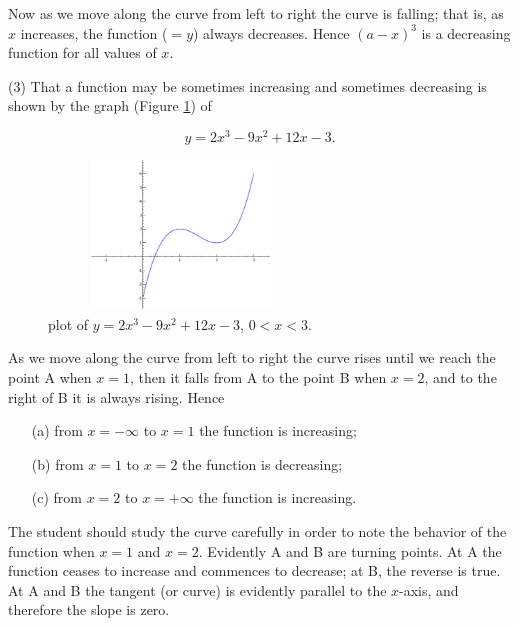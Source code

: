 \begin{example}
{\noindent
Now as we move along the curve from left to right the curve is 
falling; that is, as $x$ increases, the function ($= y$) always 
decreases. Hence $(a - x)^3$ is a decreasing function for all values of $x$.

(3) That a function may be sometimes increasing and sometimes 
decreasing is shown by the graph (Figure \ref{fig:cubic-fcn3}) of

\[
    y = 2x^3 - 9x^2 + 12x - 3.
\]

\begin{figure}[h!]
\begin{minipage}{\textwidth}
\begin{center}
\includegraphics[height=4cm,width=7cm]{cubic-fcn3.eps}
\end{center}
\end{minipage}
\caption{\sage plot of $y=2x^3 - 9x^2 + 12x - 3$, $0<x<3$.}
\label{fig:cubic-fcn3}
\end{figure}


As we move along the curve from left to right the curve rises 
until we reach the point A when $x=1$, then it falls from A to the point B
when $x=2$, and to the  right of B it is always rising. Hence

\begin{itemize}
\item[(a)] from $x = -\infty$ to $x = 1$ the function is increasing;

\item[(b)] from $x = 1$ to $x = 2$ the function is decreasing;

\item[(c)] from $x = 2$ to $x = +\infty$ the function is increasing.
\end{itemize}

The student should study the curve carefully in order to note 
the behavior of the function when $x = 1$ and $x = 2$. Evidently A and B 
are turning points. At A the function ceases to increase and 
commences to decrease; at B, the reverse is true. At A and B the 
tangent (or curve) is evidently parallel to the $x$-axis, and 
therefore the slope is zero.
}
\end{example}

